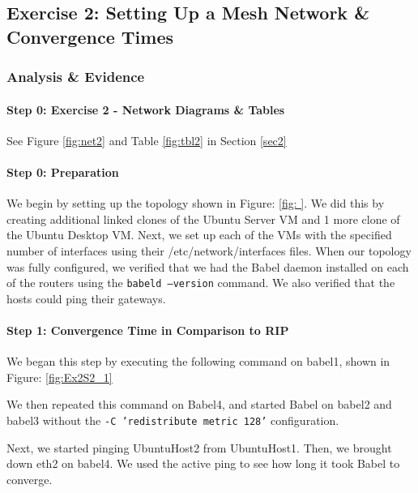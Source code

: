 \documentclass[main.tex]{subfiles}
\begin{document}
\subsection{Exercise 2: Setting Up a Mesh Network \& Convergence Times }
\subsubsection{Analysis \& Evidence }
\paragraph{Step 0: Exercise 2 - Network Diagrams \& Tables}
\hfill \break
See Figure \ref{fig:net2} and Table \ref{fig:tbl2} in Section \ref{sec2}

\paragraph{Step 0: Preparation}
\hfill \break

\noindent We begin by setting up the topology shown in Figure: \ref{fig: }. We did this by creating additional linked clones of the Ubuntu Server VM and 1 more clone of the Ubuntu Desktop VM. Next, we set up each of the VMs with the specified number of interfaces using their /etc/network/interfaces files. When our topology was fully configured, we verified that we had the Babel daemon installed on each of the routers using the \texttt{babeld --version} command. We also verified that the hosts could ping their gateways.


\paragraph{Step 1: Convergence Time in Comparison to RIP}
\hfill \break

We began this step by executing the following command on babel1, shown in Figure: \ref{fig:Ex2S2_1}


We then repeated this command on Babel4, and started Babel on babel2 and babel3 without the \texttt{-C 'redistribute metric 128'} configuration.

Next, we started pinging UbuntuHost2 from UbuntuHost1. Then, we brought down eth2 on babel4. We used the active ping to see how long it took Babel to converge.
\end{document}
